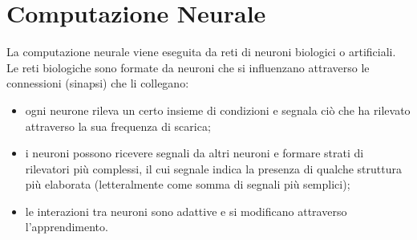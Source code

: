 \section{Computazione Neurale}

La computazione neurale viene eseguita da reti di neuroni biologici o
artificiali.
Le reti biologiche sono formate da neuroni che si influenzano attraverso le
connessioni (sinapsi) che li collegano:
\begin{itemize}
	\item ogni neurone rileva un certo insieme di condizioni e segnala ciò che ha
	rilevato attraverso la sua frequenza di scarica;
	\item i neuroni possono ricevere segnali da altri neuroni e formare strati di
	rilevatori più complessi, il cui segnale indica la presenza di qualche struttura
	più elaborata (letteralmente come somma di segnali più semplici);

	\item le interazioni tra neuroni sono adattive e si modificano attraverso
	l'apprendimento.
\end{itemize}

